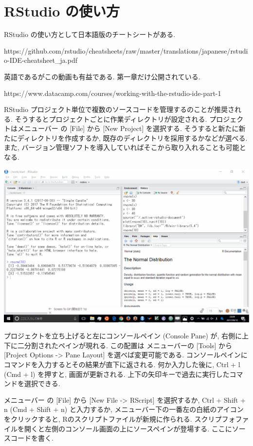 \documentclass[
  letterpaper,
  xelatex,
  ja=standard, xelatex]{bxjsbook}
\begin{document}
\section{RStudio の使い方}\label{rstudio-ux306eux4f7fux3044ux65b9}

RStudio の使い方として日本語版のチートシートがある.

https://github.com/rstudio/cheatsheets/raw/master/translations/japanese/rstudio-IDE-cheatsheet\_ja.pdf

英語であるがこの動画も有益である. 第一章だけ公開されている.

https://www.datacamp.com/courses/working-with-the-rstudio-ide-part-1

RStudio
プロジェクト単位で複数のソースコードを管理するのことが推奨される.
そうするとプロジェクトごとに作業ディレクトリが設定される.
プロジェクトはメニューバー の {[}File{]} から {[}New Project{]}
を選択する. そうすると新たに新たにディレクトリを作成するか,
既存のディレクトリを採用するかなどが選べる. また,
バージョン管理ソフトを導入していればそこから取り入れることも可能となる.

\includegraphics{figs/rstudio_project.gif}

プロジェクトを立ち上げると左にコンソールペイン (Console Pane) が,
右側に上下に二分割されたペインが現れる. この配置は メニューバーの
{[}Tools{]} から {[}Project Options -\textgreater{} Pane Layout{]}
を選べば変更可能である.
コンソールペインにコマンドを入力するとその結果が直下に返される.
何か入力した後に, Ctrl + l (Cmd + l) を押すと, 画面が更新される.
上下の矢印キーで過去に実行したコマンドを選択できる.

メニューバー の {[}File{]} から {[}New File -\textgreater{} RScript{]}
を選択するか, Ctrl + Shift + n (Cmd + Shift + n) と入力するか,
メニューバー下の一番左の白紙のアイコンをクリックすると,
Rのスクリプトファイルが新規に作られる.
スクリプフォファイルを開くと左側のコンソール画面の上にソースペインが登場する.
ここにソースコードを書く.
\end{document}
